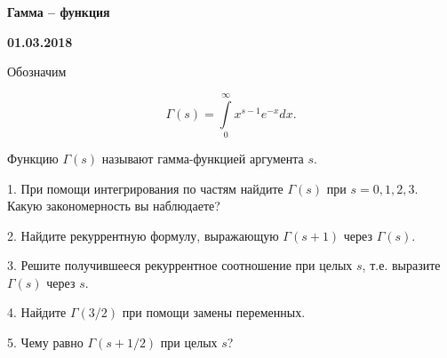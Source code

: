 \documentclass[14pt]{article}
\begin{document}
\begin{center}
\Large{\textbf{Гамма -- функция}}

\textbf{01.03.2018}

\vspace{5mm}
\end{center}

Обозначим

$$
  \Gamma(s)=\int\limits_0^\infty x^{s-1}e^{-x}dx.
$$

Функцию $\Gamma(s)$ называют гамма-функцией аргумента $s$.

1. При помощи интегрирования по частям найдите $\Gamma(s)$ при $s=0,1,2,3$. Какую закономерность вы наблюдаете?

2. Найдите рекуррентную формулу, выражающую $\Gamma(s+1)$ через $\Gamma(s)$.

3. Решите получившееся рекуррентное соотношение при целых $s$, т.е. выразите $\Gamma(s)$ через $s$.

4. Найдите $\Gamma(3/2)$ при помощи замены переменных.

5. Чему равно $\Gamma(s+1/2)$ при целых $s$?
\end{document}
